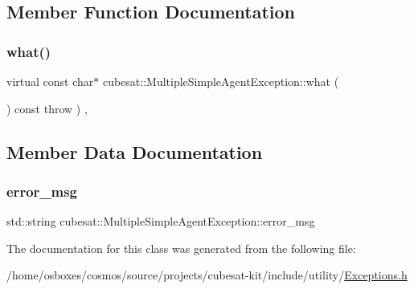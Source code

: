 \subsection{Member Function Documentation}
\mbox{\label{classcubesat_1_1MultipleSimpleAgentException_a01fc1d1216da063be9c5cf49e7885265}} 
\subsubsection{\texorpdfstring{what()}{what()}}
{\footnotesize\ttfamily virtual const char$\ast$ cubesat\+::\+Multiple\+Simple\+Agent\+Exception\+::what (\begin{DoxyParamCaption}{ }\end{DoxyParamCaption}) const throw  ) \hspace{0.3cm}{\ttfamily [inline]}, {\ttfamily [virtual]}}



\subsection{Member Data Documentation}
\mbox{\label{classcubesat_1_1MultipleSimpleAgentException_ab7a3c4ac9d8c35c62d5d91395c8d4576}} 
\subsubsection{\texorpdfstring{error\+\_\+msg}{error\_msg}}
{\footnotesize\ttfamily std\+::string cubesat\+::\+Multiple\+Simple\+Agent\+Exception\+::error\+\_\+msg\hspace{0.3cm}{\ttfamily [private]}}



The documentation for this class was generated from the following file\+:\begin{DoxyCompactItemize}
\item 
/home/osboxes/cosmos/source/projects/cubesat-\/kit/include/utility/\hyperlink{Exceptions_8h}{Exceptions.\+h}\end{DoxyCompactItemize}

